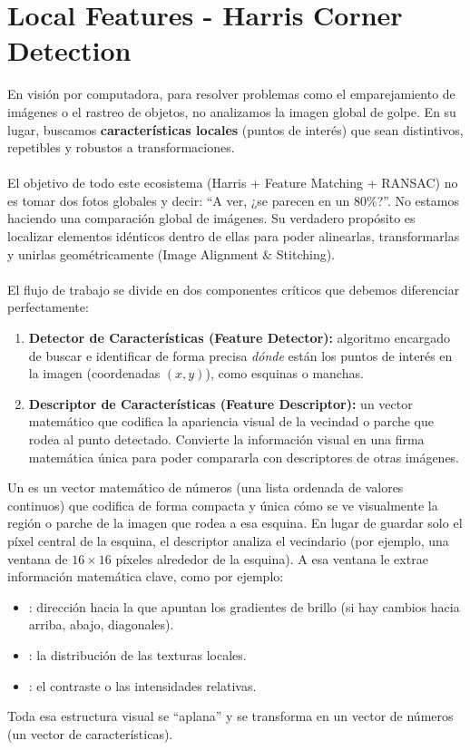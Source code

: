 \chapter{ Local Features - Harris Corner Detection}

\noindent
En visión por computadora, para resolver problemas como el emparejamiento de imágenes o el rastreo de objetos, no analizamos la imagen global de golpe. En su lugar, buscamos \textbf{características locales} (puntos de interés) que sean distintivos, repetibles y robustos a transformaciones. \\ \\
\noindent
El objetivo de todo este ecosistema (Harris + Feature Matching + RANSAC) no es tomar dos fotos globales y decir: ``A ver, ¿se parecen en un 80\%?''. No estamos haciendo una comparación global de imágenes. Su verdadero propósito es localizar elementos idénticos dentro de ellas para poder alinearlas, transformarlas y unirlas geométricamente (Image Alignment \& Stitching).\\ \\
\noindent
El flujo de trabajo se divide en dos componentes críticos que debemos diferenciar perfectamente:
\begin{enumerate}
    \item \textbf{Detector de Características (Feature Detector):} algoritmo encargado de buscar e identificar de forma precisa \textit{dónde} están los puntos de interés en la imagen (coordenadas $(x,y)$), como esquinas o manchas.
    \item \textbf{Descriptor de Características (Feature Descriptor):} un vector matemático que codifica la apariencia visual de la vecindad o parche que rodea al punto detectado. Convierte la información visual en una firma matemática única para poder compararla con descriptores de otras imágenes.
\end{enumerate}
\begin{definicion}
    Un  es un vector matemático de números (una lista ordenada de valores continuos) que codifica de forma compacta y única cómo se ve visualmente la región o parche de la imagen que rodea a esa esquina.  En lugar de guardar solo el píxel central de la esquina, el descriptor analiza el vecindario (por ejemplo, una ventana de $16 \times 16$ píxeles alrededor de la esquina). A esa ventana le extrae información matemática clave, como por ejemplo:  
    \begin{itemize}
        \item {}: dirección hacia la que apuntan los gradientes de brillo (si hay cambios hacia arriba, abajo, diagonales).
        \item {}: la distribución de las texturas locales.
        \item {}: el contraste o las intensidades relativas.
    \end{itemize}
    Toda esa estructura visual se ``aplana'' y se transforma en un vector de números (un vector de características).
\end{definicion}

